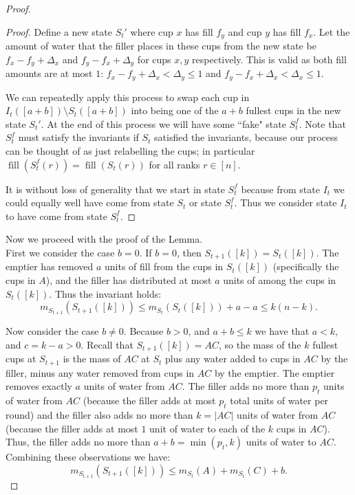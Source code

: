 \documentclass[twocolumn]{article}[10pt]
\DeclareMathOperator{\fil}{\text{fill}}
\begin{document}
\begin{proof}
\begin{proof}
Define a new state $S_t'$ where cup $x$ has fill $f_y$ and cup $y$ has fill $f_x$. 
Let the amount of water that the filler places in these cups from the new state be
$f_x-f_y+\Delta_x$ and $f_y-f_x + \Delta_y$ for cups $x,y$ respectively.
This is valid as both fill amounts are at most $1$: $f_x-f_y+\Delta_x<\Delta_y
\le 1$ and $f_y-f_x + \Delta_x < \Delta_x \le 1$.

We can repeatedly apply this process to swap each cup in $I_t([a+b])\setminus
S_t([a+b])$ into being one of the $a+b$ fullest cups in the new state $S_t'$.
At the end of this process we will have some ``fake" state $S_t^f$. Note that
$S_t^f$ must satisfy the invariants if $S_t$ satisfied the invariants, because
our process can be thought of as just relabelling the cups; in particular
$\fil(S_t^f(r)) = \fil(S_t(r))$ for all ranks $r \in [n]$.

It is without loss of generality that we start in state $S_t^f$ because from
state $I_t$ we could equally well have come from state $S_t$ or state $S_t^f$.
Thus we consider state $I_t$ to have come from state $S_t^f$.
\end{proof}

Now we proceed with the proof of the Lemma.\\
First we consider the case $b=0$. If $b=0$, then $S_{t+1}([k]) = S_t([k])$. 
The emptier has removed $a$ units of fill from the cups in $S_t([k])$
(specifically the cups in $A$), and the filler has distributed at most $a$
units of among the cups in $S_t([k])$. Thus the invariant holds:
$$m_{S_{t+1}}(S_{t+1}([k])) \le m_{S_t}(S_t([k]))+a-a \le k(n-k).$$

Now consider the case $b\neq 0$. Because $b>0$, and $a+b \le k$ we have that $a
< k$, and $c = k-a > 0$. Recall that $S_{t+1}([k]) = AC$, so the mass of the
$k$ fullest cups at $S_{t+1}$ is the mass of $AC$ at $S_t$ plus any water added
to cups in $AC$ by the filler, minus any water removed from cups in $AC$ by the
emptier. The emptier removes exactly $a$ units of water from $AC$.
The filler adds no more than $p_t$ units of water from $AC$ (because the filler
adds at most $p_t$ total units of water per round) and the filler also
adds no more than $k = |AC|$ units of water from $AC$ (because the filler adds
at most $1$ unit of water to each of the $k$ cups in $AC$).
Thus, the filler adds no more than $a+b = \min(p_t, k)$ units of water to $AC$.
Combining these observations we have:
$$m_{S_{t+1}}(S_{t+1}([k])) \le m_{S_t}(A) + m_{S_t}(C) + b.$$


\end{proof}
\end{document}
